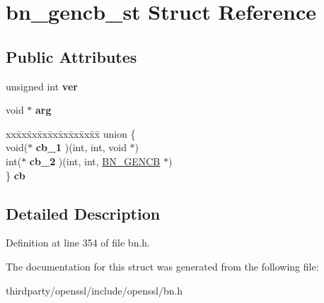 \hypertarget{structbn__gencb__st}{}\section{bn\+\_\+gencb\+\_\+st Struct Reference}
\label{structbn__gencb__st}
\subsection*{Public Attributes}
\begin{DoxyCompactItemize}
\item 
\mbox{\label{structbn__gencb__st_a1c1ac893bd1f6ea3fcfa831fda085086}} 
unsigned int {\bfseries ver}
\item 
\mbox{\label{structbn__gencb__st_a96626e1280d969f4848829c2713f22a7}} 
void $\ast$ {\bfseries arg}
\item 
\mbox{\label{structbn__gencb__st_a4a727883b67d6f8f5a5155b36c1ca347}} 
\begin{tabbing}
xx\=xx\=xx\=xx\=xx\=xx\=xx\=xx\=xx\=\kill
union \{\\
\>void($\ast$ {\bfseries cb\_1} )(int, int, void $\ast$)\\
\>int($\ast$ {\bfseries cb\_2} )(int, int, \hyperlink{structbn__gencb__st}{BN\_GENCB} $\ast$)\\
\} {\bfseries cb}\\

\end{tabbing}\end{DoxyCompactItemize}


\subsection{Detailed Description}


Definition at line 354 of file bn.\+h.



The documentation for this struct was generated from the following file\+:\begin{DoxyCompactItemize}
\item 
thirdparty/openssl/include/openssl/bn.\+h\end{DoxyCompactItemize}
